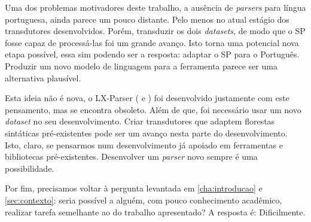 Uma dos problemas motivadores deste trabalho, a ausência de \textit{parsers} para língua portuguesa, ainda parece um pouco distante. Pelo menos no atual estágio dos transdutores desenvolvidos. Porém, transduzir os dois \textit{datasets}, de modo que o SP fosse capaz de processá-las foi um grande avanço. Isto torna uma potencial nova etapa possível, essa sim podendo ser a resposta: adaptar o SP para o Português. Produzir um novo modelo de linguagem para a ferramenta parece ser uma alternativa plausível.

Esta ideia não é nova, o LX-Parser (\cite{Branco2010OutOfTheBox} e \cite{silva-etal-2010-top}) foi desenvolvido justamente com este pensamento, mas se encontra obsoleto. Além de que, foi necessário usar um novo \textit{dataset} no seu desenvolvimento. Criar transdutores que adaptem florestas sintáticas pré-existentes pode ser um avanço nesta parte do desenvolvimento. Isto, claro, se pensarmos num desenvolvimento já apoiado em ferramentas e bibliotecas pré-existentes. Desenvolver um \textit{parser} novo sempre é uma possibilidade.

Por fim, precisamos voltar à pergunta levantada em \ref{cha:introducao} e \ref{sec:contexto}: seria possível a alguém, com pouco conhecimento acadêmico, realizar tarefa semelhante ao do trabalho apresentado? A resposta é: Dificilmente. 

